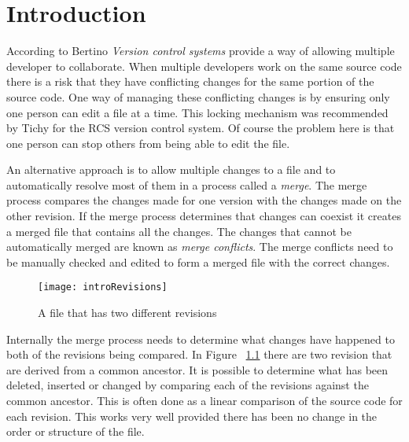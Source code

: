 
\chapter{Introduction}\label{C:intro}

According to Bertino \cite{Bertino2012} \emph{Version control systems} provide a way of allowing multiple developer to collaborate. When multiple developers work on the same source code there is a risk that they have conflicting changes for the same portion of the source code.  One way of managing these conflicting changes is by ensuring only one person can edit a file at a time. This locking mechanism was recommended by Tichy \cite{Tichy1982} for the RCS version control system. Of course the problem here is that one person can stop others from being able to edit the file. 

An alternative approach is to allow multiple changes to a file and to automatically resolve most of them in a process called a \emph{merge}.  The merge process compares the changes made for one version with the changes made on the other revision. If the merge process determines that changes can coexist it creates a merged file that contains all the changes. The changes that cannot be automatically merged are known as \emph{merge conflicts}.  The merge conflicts need to be manually checked and edited to form a merged file with the correct changes.

\begin{figure}[!t]
 \begin{center}
 \texttt{[image: introRevisions]}
 \end{center}
 \caption{A file that has two different revisions}
 \label{fig:introRevisions}
\end{figure}


Internally the merge process needs to determine what changes have happened to both of the revisions being compared. In Figure  ~\ref{fig:introRevisions} there are two revision that are derived from a common ancestor. It is possible to determine what has been deleted, inserted or changed by comparing each of the revisions against the common ancestor.  This is often done as a linear comparison of the source code for each revision. This works very well provided there has been no change in the order or structure of the file.

